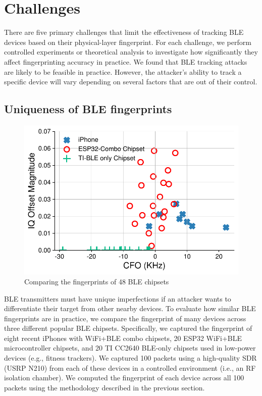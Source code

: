 \section{Challenges}
\label{sec:results2}

There are five primary challenges that limit the effectiveness of tracking
BLE devices based on their physical-layer fingerprint. For each challenge, we
perform controlled experiments or theoretical analysis to investigate how significantly they affect
fingerprinting accuracy in practice. We found that BLE tracking attacks are
likely to be feasible in practice. However, the attacker's ability to track a
specific device will vary depending on several factors that are out of
their control.

\subsection{Uniqueness of BLE fingerprints} %
\label{sec:similarity}

\begin{figure}
    \centering
    \includegraphics[width = \linewidth]{bletracking/plots/cfoiq_iphone_esp_ti2.pdf} 
    \caption{Comparing the fingerprints of 48 BLE chipsets}
\label{fig:cfoiq}
\end{figure}

BLE transmitters must have unique imperfections if an attacker wants to
differentiate their target from other nearby devices.  To evaluate how
similar BLE fingerprints are in practice, we compare the fingerprint of  many
devices across three different popular BLE chipsets. Specifically, we
captured the fingerprint of eight recent iPhones with WiFi+BLE combo
chipsets, 20 ESP32 WiFi+BLE microcontroller chipsets, and 20 TI CC2640
BLE-only chipsets used in low-power devices (e.g., fitness trackers).  We
captured 100 packets using a high-quality SDR (USRP N210) from each of these
devices in a controlled environment (i.e., an RF isolation chamber). We
computed the fingerprint of each device across all 100 packets using the methodology described in
the previous section.


